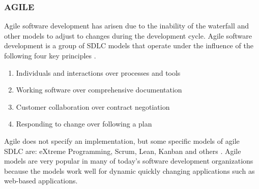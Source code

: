 \documentclass[SDSUThesis.tex]{subfiles}
\begin{document}
        
    \subsubsection{AGILE}
        Agile software development has arisen due to the inability
        of the waterfall and other models to adjust to changes during the 
        development cycle.  
        Agile software development is a group of SDLC models that operate
        under the influence of the following four key principles \cite{Beck2001}.
        \begin{enumerate}
            \item Individuals and interactions over processes and tools
            \item Working software over comprehensive documentation
            \item Customer collaboration over contract negotiation
            \item Responding to change over following a plan
        \end{enumerate}
        Agile does not specify an implementation, but
        some specific models of agile SDLC are:
        eXtreme Programming, Scrum, Lean, Kanban and others 
        \cite{Moniruzzaman2013, Hibbs2009}.  Agile models 
        are very popular in many of today's software development
        organizations because the models work well for dynamic
        quickly changing applications such as web-based applications.
        
        
\end{document}
